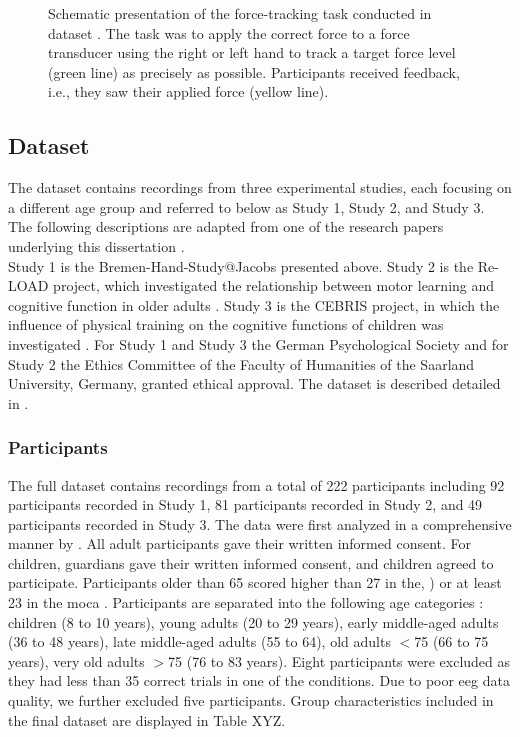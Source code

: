 \begin{figure}[h]
\begin{center}

\caption[Schematic presentation of the force-tracking task conducted in dataset .]{Schematic presentation of the force-tracking task conducted in dataset . The task was to apply the correct force to a force transducer using the right or left hand to track a target force level (green line) as precisely as possible. Participants received feedback, i.e., they saw their applied force (yellow line).}
\label{fig:DSI_exp1}
\end{center}
\end{figure}

\subsection{Dataset }
\label{methods:datasets:II}
The  dataset contains recordings from three experimental studies, each focusing on a different age group and referred to below as Study 1, Study 2, and Study 3. The following descriptions are adapted from one of the research papers underlying this dissertation \cite{Goelz2023}.\\
Study 1 is the Bremen-Hand-Study@Jacobs presented above. Study 2 is the Re-LOAD project, which investigated the relationship between motor learning and cognitive function in older adults \cite{HUBNER2018104, Hübner2018}. Study 3 is the CEBRIS project, in which the influence of physical training on the cognitive functions of children was investigated \cite{Koutsandreou2016}. For Study 1 and Study 3 the German Psychological Society and for Study 2 the Ethics Committee of the Faculty of Humanities of the Saarland University, Germany, granted ethical approval. The dataset is described detailed in \cite{Reuter2019}. 

\subsubsection{Participants}
\label{methods:datasets:II:participants}
The full dataset contains recordings from a total of 222 participants including 92 participants recorded in Study 1, 81 participants recorded in Study 2, and 49 participants recorded in Study 3. The data were first analyzed in a comprehensive manner by \citeauthor{Reuter2019} \cite{Reuter2019}. All adult participants gave their written informed consent. For children, guardians gave their written informed consent, and children agreed to participate. Participants older than 65 scored higher than 27 in the, \cite{Folstein1975}) or at least 23 in the \gls{moca} \cite{Julayanont2017, Nasreddine2005}. Participants are separated into the following age categories \cite{Reuter2019}: children (8 to 10 years), young adults (20 to 29 years), early middle-aged adults (36 to 48 years), late middle-aged adults (55 to 64), old adults $<$75 (66 to 75 years), very old adults $>$75 (76 to 83 years). Eight participants were excluded as they had less than 35 correct trials in one of the conditions. Due to poor \gls{eeg} data quality, we further excluded five participants. Group characteristics included in the final dataset are displayed in Table XYZ.

